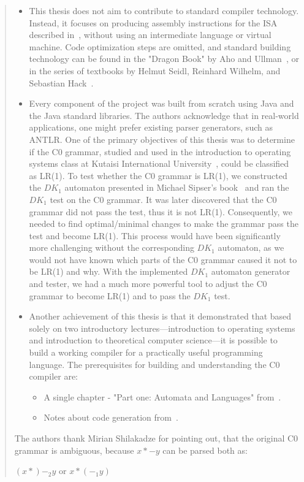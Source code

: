 \documentclass[11pt]{report}
\begin{document}
    \begin{abstract}
        \begin{itemize}
            \item This thesis does not aim to contribute to standard compiler technology. Instead, it focuses on producing assembly instructions for the ISA described in~\cite{sysbook}, without using an intermediate language or virtual machine. Code optimization steps are omitted, and standard building technology can be found in the "Dragon Book" by Aho and Ullman~\cite{dragon}, or in the series of textbooks by Helmut Seidl, Reinhard Wilhelm, and Sebastian Hack~\cite{hsvm,hsaat,hssasa}.
            \item Every component of the project was built from scratch using Java and the Java standard libraries. The authors acknowledge that in real-world applications, one might prefer existing parser generators, such as ANTLR. One of the primary objectives of this thesis was to determine if the C0 grammar, studied and used in the introduction to operating systems class at Kutaisi International University~\cite{sysbook}, could be classified as LR(1). To test whether the C0 grammar is LR(1), we constructed the \(DK_{1}\) automaton presented in Michael Sipser's book~\cite{sipser} and ran the \(DK_{1}\) test on the C0 grammar. It was later discovered that the C0 grammar did not pass the test, thus it is not LR(1). Consequently, we needed to find optimal/minimal changes to make the grammar pass the test and become LR(1). This process would have been significantly more challenging without the corresponding \(DK_{1}\) automaton, as we would not have known which parts of the C0 grammar caused it not to be LR(1) and why. With the implemented \(DK_{1}\) automaton generator and tester, we had a much more powerful tool to adjust the C0 grammar to become LR(1) and to pass the \(DK_{1}\) test.
            \item Another achievement of this thesis is that it demonstrated that based solely on two introductory lectures—introduction to operating systems and introduction to theoretical computer science—it is possible to build a working compiler for a practically useful programming language. The prerequisites for building and understanding the C0 compiler are:
            \begin{itemize}
                \item A single chapter - "Part one: Automata and Languages" from~\cite{sipser}.
                \item Notes about code generation from~\cite{sysbook}.
            \end{itemize}
        \end{itemize}

        \vspace{10pt}

        The authors thank Mirian Shilakadze for pointing out, that the original C0 grammar is ambiguous, because $x*-y$ can be parsed both as:
        \begin{center}
            $(x*)-_2y$ or $x*(-_1y)$
        \end{center}
    \end{abstract}
\end{document}
